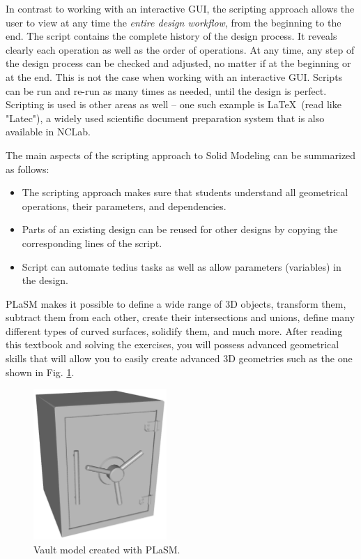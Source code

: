 In contrast to working with an interactive GUI, the scripting approach
allows the user to view at any time the {\em entire design workflow}, from 
the beginning to the end. The script contains 
the complete history of the design process. It reveals clearly each 
operation as well as the order of operations. At any time, any step 
of the design process can be checked and adjusted, no matter if at the 
beginning or at the end. This is not the case when working with an interactive GUI.
Scripts can be run and re-run as many times as needed, until the design is perfect. 
Scripting is used is other areas as well -- one such example is \LaTeX \ (read like "Latec"), 
a widely used scientific document preparation system that is also available in NCLab.

The main aspects of the scripting approach to Solid Modeling can be summarized as follows:

\begin{itemize}

\item The scripting approach makes sure that students understand
      all geometrical operations, their parameters, and dependencies.
\item Parts of an existing design can be reused for other designs by copying the 
      corresponding lines of the script. 
\item Script can automate tedius tasks as well as allow parameters (variables)
      in the design. 
\end{itemize}
PLaSM makes it possible to define a wide range of 3D 
objects, transform them, subtract them from each other, create their intersections
and unions, define many different types of curved surfaces, solidify them, and 
much more. After reading this textbook and solving the exercises, you will possess
advanced geometrical skills that will allow you to easily create advanced 3D geometries 
such as the one shown in Fig. \ref{fig:vault0}.

\begin{figure}[!ht]
\begin{center}
\includegraphics[width=0.45\textwidth]{img/vault.png}
\end{center}
\vspace{-4mm}
\caption{Vault model created with PLaSM.}
\label{fig:vault0}
\end{figure}


